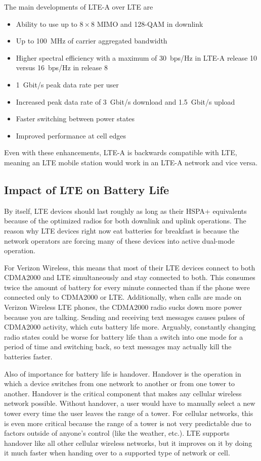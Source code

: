 The main developments of LTE-A over LTE are~\cite{TR36.912}
\begin{itemize}
\item Ability to use up to $8\times8$ MIMO and 128-QAM in downlink
\item Up to 100~MHz of carrier aggregated bandwidth
\item Higher spectral efficiency with a maximum of 30~bps/Hz in LTE-A release 10 versus 16~bps/Hz in release 8
\item 1~Gbit/s peak data rate per user
\item Increased peak data rate of 3~Gbit/s download and 1.5~Gbit/s upload
\item Faster switching between power states
\item Improved performance at cell edges
\end{itemize}
Even with these enhancements, LTE-A is backwards compatible with LTE, meaning an LTE mobile station would work in an LTE-A network and vice versa.

\subsection{Impact of LTE on Battery Life}

By itself, LTE devices should last roughly as long as their HSPA+ equivalents because of the optimized radios for both downlink and uplink operations. The reason why LTE devices right now eat batteries for breakfast is because the network operators are forcing many of these devices into active dual-mode operation.

For Verizon Wireless, this means that most of their LTE devices connect to both CDMA2000 and LTE simultaneously and stay connected to both. This consumes twice the amount of battery for every minute connected than if the phone were connected only to CDMA2000 or LTE. Additionally, when calls are made on Verizon Wireless LTE phones, the CDMA2000 radio sucks down more power because you are talking. Sending and receiving text messages causes pulses of CDMA2000 activity, which cuts battery life more. Arguably, constantly changing radio states could be worse for battery life than a switch into one mode for a period of time and switching back, so text messages may actually kill the batteries faster.

Also of importance for battery life is handover. Handover is the operation in which a device switches from one network to another or from one tower to another. Handover is the critical component that makes any cellular wireless network possible. Without handover, a user would have to manually select a new tower every time the user leaves the range of a tower. For cellular networks, this is even more critical because the range of a tower is not very predictable due to factors outside of anyone’s control (like the weather, etc.). LTE supports handover like all other cellular wireless networks, but it improves on it by doing it much faster when handing over to a supported type of network or cell.